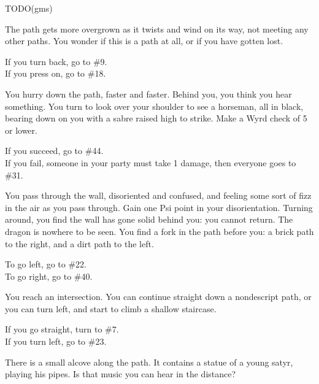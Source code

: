 \documentclass[green]{gl2018}
\begin{document}
\begin{large}
\begin{location}{24}
\end{location}
\begin{location}{25}
TODO(gms)
\end{location}
\begin{location}{26}
The path gets more overgrown as it twists and wind on its way, not meeting any other paths. You wonder if this is a path at all, or if you have gotten lost. 
\begin{fromhere}If you turn back, go to \#9.\\ If you press on, go to \#18.\end{fromhere}
\end{location}
\begin{location}{27}
You hurry down the path,  faster and faster. Behind you, you think you hear something. You turn to look over your shoulder to see a horseman, all in black, bearing down on you with a sabre raised high to strike. Make a Wyrd check of 5 or lower. 
\begin{fromhere}
If you succeed, go to \#44.\\
 If you fail, someone in your party must take 1 damage, then everyone goes to \#31.
\end{fromhere}
\end{location}
\begin{location}{28}
You pass through the wall, disoriented and confused, and feeling some sort of fizz in the air as you pass through.  Gain one Psi point in your disorientation.  Turning around, you find the wall has gone solid behind you: you cannot return.  The dragon is nowhere to be seen.  You find a fork in the path before you: a brick path to the right, and a dirt path to the left.  
\begin{fromhere}To go left, go to \#22.\\  To go right, go to \#40.\end{fromhere}
\end{location}
\begin{location}{29}
You reach an intersection. You can continue straight down a nondescript path, or you can turn left, and start to climb a shallow staircase.  
\begin{fromhere}If you go straight, turn to \#7.\\ If you turn left, go to \#23.\end{fromhere}
\end{location}
\begin{location}{30}
There is a small alcove along the path. It contains a statue of a young satyr, playing his pipes. Is that music you can hear in the distance? 

\end{location}
\end{large}
\end{document}
